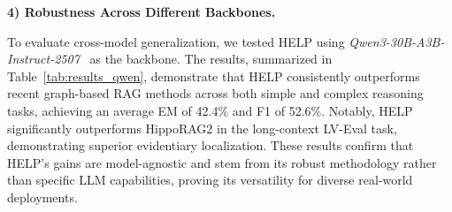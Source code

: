 \textbf{4) Robustness Across Different Backbones.} 


To evaluate cross-model generalization, we tested HELP using \textit{Qwen3-30B-A3B-Instruct-2507}~\cite{qwen3technicalreport} as the backbone. The results, summarized in Table~\ref{tab:results_qwen}, demonstrate that HELP consistently outperforms recent graph-based RAG methods across both simple and complex reasoning tasks, achieving an average EM of 42.4\% and F1 of 52.6\%. Notably, HELP significantly outperforms HippoRAG2 in the long-context LV-Eval task, demonstrating superior evidentiary localization. These results confirm that HELP’s gains are model-agnostic and stem from its robust methodology rather than specific LLM capabilities, proving its versatility for diverse real-world deployments.

\vspace{-10pt}
